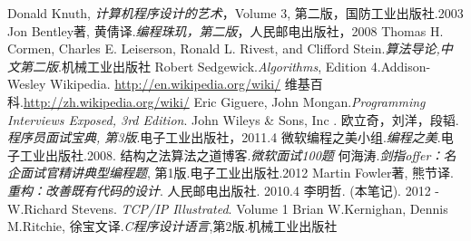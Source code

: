 

\begin{thebibliography}{99}

    Donald Knuth, \emph{计算机程序设计的艺术}，Volume 3, 第二版，国防工业出版社.2003
    Jon Bentley著, 黄倩译.\emph{编程珠玑，第二版}，人民邮电出版社，2008
    Thomas H. Cormen, Charles E. Leiserson, Ronald L. Rivest, and Clifford Stein.\emph{算法导论,中文第二版}.机械工业出版社
    Robert Sedgewick.\emph{Algorithms}, Edition 4.Addison-Wesley
    Wikipedia. \url{http://en.wikipedia.org/wiki/}
    维基百科.\url{http://zh.wikipedia.org/wiki/}
     Eric Giguere, John Mongan.\emph{Programming Interviews Exposed, 3rd Edition}. John Wileys \& Sons, Inc .
     欧立奇，刘洋，段韬.\emph{程序员面试宝典, 第3版}.电子工业出版社，2011.4 
     微软编程之美小组.\emph{编程之美}.电子工业出版社.2008.
    结构之法算法之道博客.\emph{微软面试100题}
    何海涛.\emph{剑指offer：名企面试官精讲典型编程题}, 第1版.电子工业出版社.2012
    Martin Fowler著, 熊节译. \emph{重构：改善既有代码的设计}. 人民邮电出版社. 2010.4
    李明哲. \emph{\bookname} (本笔记). 2012 - \number\year 
    W.Richard Stevens. \emph{TCP/IP Illustrated}. Volume 1
    Brian W.Kernighan, Dennis M.Ritchie, 徐宝文译.\emph{C程序设计语言},第2版.机械工业出版社

\end{thebibliography}






